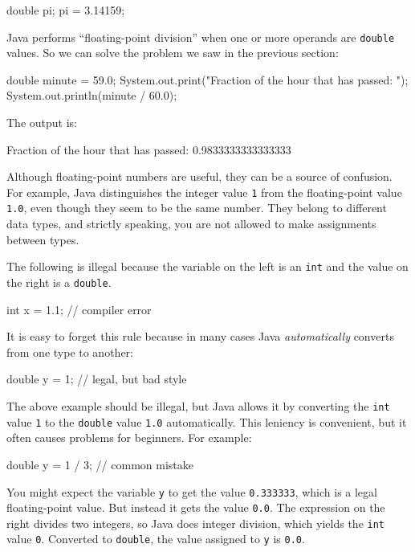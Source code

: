 \documentclass[12pt]{book}
\theoremstyle{exercise}
\newcommand{\java}[1]{\verb"#1"}
\begin{document}
\begin{code}
    double pi;
    pi = 3.14159;
\end{code}

Java performs ``floating-point division'' when one or more operands are \java{double} values.
So we can solve the problem we saw in the previous section:

\begin{code}
    double minute = 59.0;
    System.out.print("Fraction of the hour that has passed: ");
    System.out.println(minute / 60.0);
\end{code}

The output is:

\begin{stdout}
Fraction of the hour that has passed: 0.9833333333333333
\end{stdout}

Although floating-point numbers are useful, they can be a source of confusion.
For example, Java distinguishes the integer value \java{1} from the floating-point value \java{1.0}, even though they seem to be the same number.
They belong to different data types, and strictly speaking, you are not allowed to make assignments between types.

The following is illegal because the variable on the left is an \java{int} and the value on the right is a \java{double}.

\begin{code}
    int x = 1.1;  // compiler error
\end{code}

It is easy to forget this rule because in many cases Java {\em automatically} converts from one type to another:

\begin{code}
    double y = 1;  // legal, but bad style
\end{code}

The above example should be illegal, but Java allows it by converting the \java{int} value \java{1} to the \java{double} value \java{1.0} automatically.
This leniency is convenient, but it often causes problems for beginners.
For example:

\begin{code}
    double y = 1 / 3;  // common mistake
\end{code}


You might expect the variable \java{y} to get the value \java{0.333333}, which is a legal floating-point value.
But instead it gets the value \java{0.0}.
The expression on the right divides two integers, so Java does integer division, which yields the \java{int} value \java{0}.
Converted to \java{double}, the value assigned to \java{y} is \java{0.0}.
\end{document}
